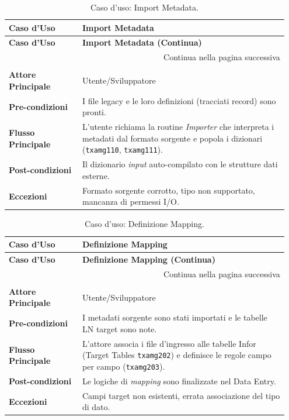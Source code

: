 \begin{longtable}{@{} p{0.25\linewidth} p{0.70\linewidth} @{}}
    \toprule
    \textbf{Caso d'Uso} & \textbf{Import Metadata} \\
    \midrule
    \endfirsthead
    \toprule
    \textbf{Caso d'Uso} & \textbf{Import Metadata (Continua)} \\
    \midrule
    \endhead
    \midrule
    \multicolumn{2}{r}{{Continua nella pagina successiva}} \\
    \bottomrule
    \endfoot
    \bottomrule
    \caption{Caso d'uso: Import Metadata.} \label{tab:uc_import_metadata} \\
    \endlastfoot
    \textbf{Attore Principale} & Utente/Sviluppatore \\
    \midrule
    \textbf{Pre-condizioni} & I file legacy e le loro definizioni (tracciati record) sono pronti. \\
    \midrule
    \textbf{Flusso Principale} & L'utente richiama la routine \textit{Importer} che interpreta i metadati dal formato sorgente e popola i dizionari (\texttt{txamg110}, \texttt{txamg111}). \\
    \midrule
    \textbf{Post-condizioni} & Il dizionario \textit{input} auto-compilato con le strutture dati esterne. \\
    \midrule
    \textbf{Eccezioni} & Formato sorgente corrotto, tipo non supportato, mancanza di permessi I/O. \\
\end{longtable}

\begin{longtable}{@{} p{0.25\linewidth} p{0.70\linewidth} @{}}
    \toprule
    \textbf{Caso d'Uso} & \textbf{Definizione Mapping} \\
    \midrule
    \endfirsthead
    \toprule
    \textbf{Caso d'Uso} & \textbf{Definizione Mapping (Continua)} \\
    \midrule
    \endhead
    \midrule
    \multicolumn{2}{r}{{Continua nella pagina successiva}} \\
    \bottomrule
    \endfoot
    \bottomrule
    \caption{Caso d'uso: Definizione Mapping.} \label{tab:uc_definizione_mapping} \\
    \endlastfoot
    \textbf{Attore Principale} & Utente/Sviluppatore \\
    \midrule
    \textbf{Pre-condizioni} & I metadati sorgente sono stati importati e le tabelle LN target sono note. \\
    \midrule
    \textbf{Flusso Principale}& L'attore associa i file d'ingresso alle tabelle Infor (Target Tables \texttt{txamg202}) e definisce le regole campo per campo (\texttt{txamg203}). \\
    \midrule
    \textbf{Post-condizioni} & Le logiche di \textit{mapping} sono finalizzate nel Data Entry. \\
    \midrule
    \textbf{Eccezioni} & Campi target non esistenti, errata associazione del tipo di dato. \\
\end{longtable}

